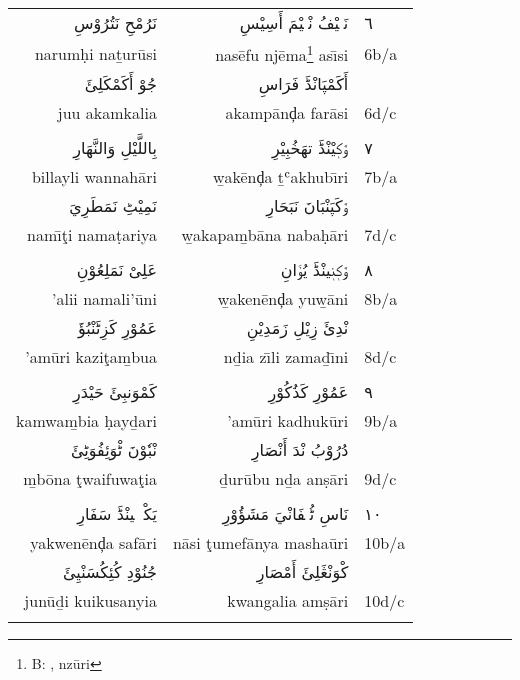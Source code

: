 \documentclass[a4paper, 12pt]{report}
\newcommand\AS[1]{{\citationfont\RLE{#1}}}
\newcommand\Tr[1]{{\fontspec[Scale=1, Color=666666]{Linux Biolinum O}#1}}   %
\begin{document}
\begin{longtable}{rrl}
\textarabic{نَرُمْحِ نَتُرُوْسِ} & \textarabic{نَسٖيْفُ نْجٖيْمَ أَسِيْسِ} & \textarabic{٦} \\* 
\Tr{narumḥi naṯurūsi} & \Tr{nasēfu njēma\footnote{B: \AS{ننْزُوْرِ}, nzūri} ası̄si} & \Tr{6b/a} \\ 
\textarabic{جُوْ أَكَمْكَلِئَ} & \textarabic{أَكَمْپَانْڈَ فَرَاسِ} &  \\* 
\Tr{juu akamkalia} & \Tr{akampānḑa farāsi} & \Tr{6d/c} \\ 
\\[8mm] 

\textarabic{بِاللَّيْلِ وَالنَّهَارِ} & \textarabic{ۏَكٖيْنْڈَ تهَخُبِيْرِ} & \textarabic{٧} \\* 
\Tr{billayli wannahāri} & \Tr{w̱akēnḑa ṯʿakhubı̄ri} & \Tr{7b/a} \\ 
\textarabic{نَمِيْٹِ نَمَطَرِيَ} & \textarabic{ۏَكَپَنْبَانَ نَبَحَارِ} &  \\* 
\Tr{namı̄ţi namaṭariya} & \Tr{w̱akapam̱bāna nabaḥāri} & \Tr{7d/c} \\ 
\\[8mm] 

\textarabic{عَلِىْ نَمَلِعُوْنِ} & \textarabic{ۏَكٖنٖينْڈَ يُۏَانِ} & \textarabic{٨} \\* 
\Tr{'alii namali'ūni} & \Tr{w̱akenēnḑa yuw̱āni} & \Tr{8b/a} \\ 
\textarabic{عَمُوْرِ كَزِٹَنْبُؤَ} & \textarabic{نْدِئَ زِيْلِ زَمَدِيْنِ} &  \\* 
\Tr{'amūri kaziţam̱bua} & \Tr{nḏia zı̄li zamaḏı̄ni} & \Tr{8d/c} \\ 
\\[8mm] 

\textarabic{كَمْوَنبِئَ حَيْدَرِ} & \textarabic{عَمُوْرِ كَذُكُوْرِ} & \textarabic{٩} \\* 
\Tr{kamwam̱bia ḥayḏari} & \Tr{'amūri kadhukūri} & \Tr{9b/a} \\ 
\textarabic{نْبٗوْنَ ٹْوَئِفُوَٹِئَ} & \textarabic{دُرُوْبُ نْدَ أَنْصَارِ} &  \\* 
\Tr{m̱bōna ţwaifuwaţia} & \Tr{ḏurūbu nḏa anṣāri} & \Tr{9d/c} \\ 
\\[8mm] 

\textarabic{يَكْوٖنٖينْڈَ سَفَارِ} & \textarabic{نَاسِ ٹُمٖفَانْيَ مَشَؤُوْرِ} & \textarabic{١٠} \\* 
\Tr{yakwenēnḑa safāri} & \Tr{nāsi ţumefānya mashaūri} & \Tr{10b/a} \\ 
\textarabic{جُنُوْدِ كُئِكُسَنْيِئَ} & \textarabic{كْوَنْڠَلِئَ أَمْصَارِ} &  \\* 
\Tr{junūḏi kuikusanyia} & \Tr{kwangalia amṣāri} & \Tr{10d/c} \\ 
\\[8mm] 

\end{longtable} 
\end{document}
